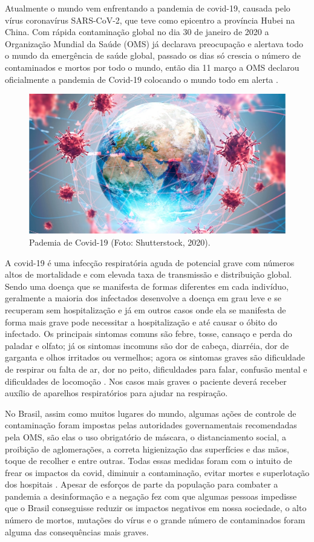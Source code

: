 \documentclass[tcc1]{uftex}
\begin{document}
	
Atualmente o mundo vem enfrentando a pandemia de covid-19, causada pelo vírus coronavírus SARS-CoV-2, que teve como epicentro a província Hubei na China. Com rápida contaminação global no dia 30 de janeiro de 2020 a Organização Mundial da Saúde (OMS) já declarava preocupação e alertava todo o mundo da emergência de saúde global, passado os dias só crescia o número de contaminados  e mortos por todo o mundo, então dia 11 março a OMS declarou oficialmente a pandemia de Covid-19 colocando o mundo todo em alerta \cite{G1}.
	
	\begin{figure}[h]

    \centering
    \includegraphics[width=12cm]{covid.jpg} %
    \caption{Pademia de Covid-19 (Foto: Shutterstock, 2020).}
    \end{figure}
	
A covid-19 é uma infecção respiratória aguda de potencial grave com números altos de mortalidade e com elevada taxa de transmissão e distribuição global. Sendo uma doença que se manifesta de formas diferentes em cada indivíduo, geralmente a maioria dos infectados desenvolve a doença em grau leve e se recuperam sem hospitalização e já em outros casos onde ela se manifesta de forma mais grave pode necessitar a hospitalização e até causar o óbito do infectado. Os principais sintomas comuns são febre, tosse, cansaço e perda do paladar e olfato; já os sintomas incomuns são dor de cabeça, diarréia, dor de garganta e olhos irritados ou vermelhos; agora os sintomas graves são dificuldade de respirar ou falta de ar, dor no peito, dificuldades para falar, confusão mental e dificuldades de locomoção \cite{WorldHealthOrganization}. Nos casos mais graves o paciente deverá receber auxílio de aparelhos respiratórios para ajudar na respiração.

No Brasil, assim como muitos lugares do mundo, algumas ações de controle de contaminação foram impostas pelas autoridades governamentais recomendadas pela OMS, são elas o uso obrigatório de máscara, o distanciamento social, a proibição de aglomerações, a correta higienização das superfícies e das mãos, toque de recolher e entre outras. Todas essas medidas foram com o intuito de frear os impactos da covid, diminuir a contaminação, evitar mortes e superlotação dos hospitais \cite{werneck2020pandemia}. Apesar de esforços de parte da população para combater a pandemia a desinformação e a negação fez com que algumas pessoas impedisse que o Brasil conseguisse reduzir os impactos negativos em nossa sociedade, o alto número de mortos, mutações do vírus e o grande número de contaminados foram alguma das consequências mais graves.
	
\end{document}
